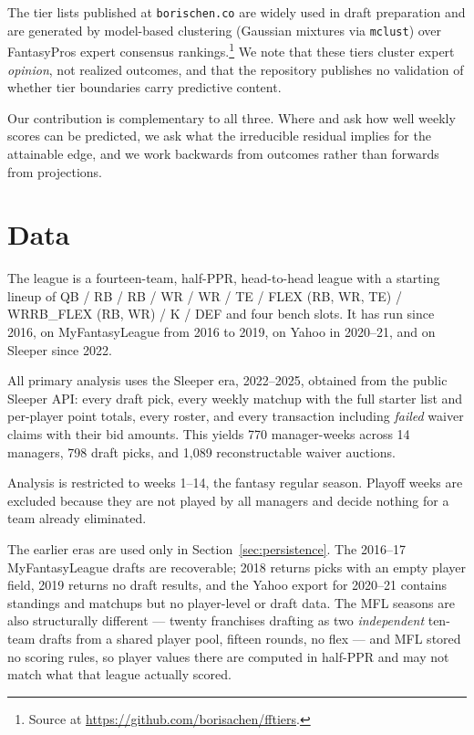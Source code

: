 \documentclass[11pt]{article}
\begin{document}
The tier lists published at \texttt{borischen.co} are widely used in draft
preparation and are generated by model-based clustering (Gaussian mixtures via
\texttt{mclust}) over FantasyPros expert consensus rankings.\footnote{Source at
\url{https://github.com/borisachen/fftiers}.} We note that these tiers cluster
expert \emph{opinion}, not realized outcomes, and that the repository publishes
no validation of whether tier boundaries carry predictive content.

Our contribution is complementary to all three. Where \citet{beckersun2016} and
\citet{lutz2015} ask how well weekly scores can be predicted, we ask what the
irreducible residual implies for the attainable edge, and we work backwards from
outcomes rather than forwards from projections.

\section{Data}\label{sec:data}

The league is a fourteen-team, half-PPR, head-to-head league with a starting
lineup of QB / RB / RB / WR / WR / TE / FLEX (RB, WR, TE) / WRRB\_FLEX (RB, WR)
/ K / DEF and four bench slots. It has run since 2016, on MyFantasyLeague from
2016 to 2019, on Yahoo in 2020--21, and on Sleeper since 2022.

All primary analysis uses the Sleeper era, 2022--2025, obtained from the public
Sleeper API: every draft pick, every weekly matchup with the full starter list
and per-player point totals, every roster, and every transaction including
\emph{failed} waiver claims with their bid amounts. This yields 770
manager-weeks across 14 managers, 798 draft picks, and 1{,}089 reconstructable
waiver auctions.

Analysis is restricted to weeks 1--14, the fantasy regular season. Playoff weeks
are excluded because they are not played by all managers and decide nothing for
a team already eliminated.

The earlier eras are used only in Section~\ref{sec:persistence}. The 2016--17
MyFantasyLeague drafts are recoverable; 2018 returns picks with an empty player
field, 2019 returns no draft results, and the Yahoo export for 2020--21 contains
standings and matchups but no player-level or draft data. The MFL seasons are
also structurally different --- twenty franchises drafting as two
\emph{independent} ten-team drafts from a shared player pool, fifteen rounds, no
flex --- and MFL stored no scoring rules, so player values there are computed in
half-PPR and may not match what that league actually scored.
\end{document}
